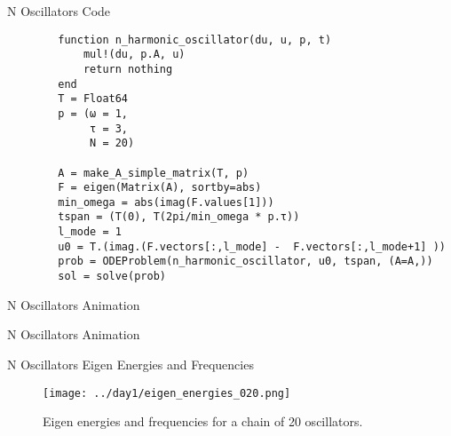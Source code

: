 \documentclass[aspectratio=169]{beamer}
\begin{document}
\begin{frame}[fragile]{N Oscillators Code}
    \begin{verbatim}
        function n_harmonic_oscillator(du, u, p, t)
            mul!(du, p.A, u) 
            return nothing
        end
        T = Float64
        p = (ω = 1, 
             τ = 3,
             N = 20)

        A = make_A_simple_matrix(T, p)
        F = eigen(Matrix(A), sortby=abs)
        min_omega = abs(imag(F.values[1]))
        tspan = (T(0), T(2pi/min_omega * p.τ))
        l_mode = 1
        u0 = T.(imag.(F.vectors[:,l_mode] -  F.vectors[:,l_mode+1] ))
        prob = ODEProblem(n_harmonic_oscillator, u0, tspan, (A=A,))
        sol = solve(prob)
    \end{verbatim}
\end{frame}

\begin{frame}{N Oscillators Animation}
    \centering
\end{frame}

\begin{frame}{N Oscillators Animation}
    \centering
\end{frame}

\begin{frame}{N Oscillators Eigen Energies and Frequencies}
    \centering 
    \begin{figure}
    \texttt{[image: ../day1/eigen\_energies\_020.png]} \\
    \caption{Eigen energies and frequencies for a chain of 20 oscillators.} 
    \end{figure}
\end{frame}
\end{document}
